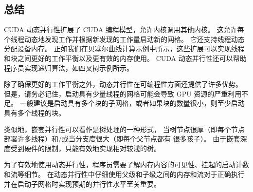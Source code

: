 \subsection{总结}
CUDA 动态并行性扩展了 CUDA 编程模型，允许内核调用其他内核。 
这允许每个线程动态地发现工作并根据新发现的工作量启动新的网格。 
它还支持线程动态分配设备内存。 
正如我们在贝塞尔曲线计算示例中所示，这些扩展可以实现线程和块之间更好的工作平衡以及更有效的内存使用。 
CUDA 动态并行性还可以帮助程序员实现递归算法，如四叉树示例所示。

除了确保更好的工作平衡之外，动态并行性在可编程性方面还提供了许多优势。 
但是，请务必记住，启动具有少量线程的网格可能会导致 GPU 资源的严重利用不足。 
一般建议是启动具有多个块的子网格，或者如果块的数量很小，则至少启动具有多个线程的块。

类似地，嵌套并行性可以看作是树处理的一种形式，
当树节点很厚（即每个节点部署许多线程）和/或当分支度很大（即每个父节点都有 很多孩子）。 
由于嵌套深度受到硬件的限制，只能有效地实现相对较浅的树。

为了有效地使用动态并行性，程序员需要了解内存内容的可见性、挂起的启动计数和流等细节。 
在动态并行性中仔细使用父级和子级之间的内存和流对于正确执行并在启动子网格时实现预期的并行性水平至关重要。